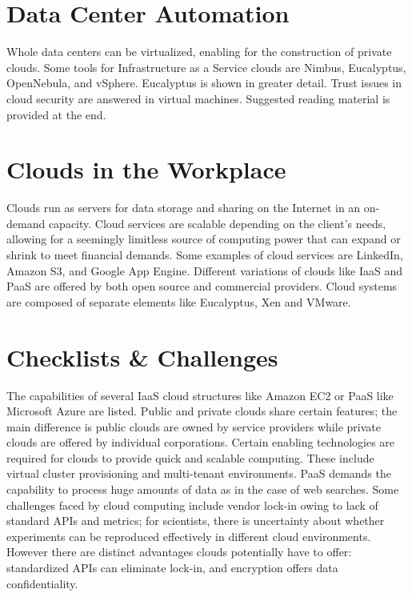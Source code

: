

\section{Data Center Automation}

Whole data centers can be virtualized, enabling for the construction of
private clouds. Some tools for Infrastructure as a Service clouds are
Nimbus, Eucalyptus, OpenNebula, and vSphere. Eucalyptus is shown in
greater detail. Trust issues in cloud security are answered in virtual
machines. Suggested reading material is provided at the end.



\section{Clouds in the Workplace}

Clouds run as servers for data storage and sharing on the Internet in an
on-demand capacity. Cloud services are scalable depending on the
client's needs, allowing for a seemingly limitless source of computing
power that can expand or shrink to meet financial demands. Some examples
of cloud services are LinkedIn, Amazon S3, and Google App Engine.
Different variations of clouds like IaaS and PaaS are offered by both
open source and commercial providers. Cloud systems are composed of
separate elements like Eucalyptus, Xen and VMware.


\section{Checklists \& Challenges}

The capabilities of several IaaS cloud structures like Amazon EC2 or
PaaS like Microsoft Azure are listed. Public and private clouds share
certain features; the main difference is public clouds are owned by
service providers while private clouds are offered by individual
corporations. Certain enabling technologies are required for clouds to
provide quick and scalable computing. These include virtual cluster
provisioning and multi-tenant environments. PaaS demands the capability
to process huge amounts of data as in the case of web searches. Some
challenges faced by cloud computing include vendor lock-in owing to lack
of standard APIs and metrics; for scientists, there is uncertainty about
whether experiments can be reproduced effectively in different cloud
environments. However there are distinct advantages clouds potentially
have to offer: standardized APIs can eliminate lock-in, and encryption
offers data confidentiality.

